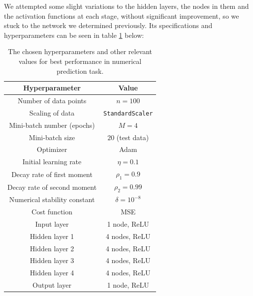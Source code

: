We attempted some slight variations to the hidden layers, the nodes in them and the activation functions at each stage, without significant improvement, so we stuck to the network we determined previously. Its specifications and hyperparameters can be seen in table \ref{tab:numericalprediction} below: 
\begin{table}[h!]
  \centering
  \small
  \begin{tabular}{|c|c|}
    \hline
    \textbf{Hyperparameter} & \textbf{Value} \\
    \hline
    Number of data points & $n = 100$ \\
    \hline
    Scaling of data & \texttt{StandardScaler} \\
    \hline
    Mini-batch number (epochs) & $M = 4$ \\
    \hline
    Mini-batch size & $20$ (test data) \\
    \hline
    Optimizer & Adam \\
    \hline
    Initial learning rate & $\eta = 0.1$ \\
    \hline
    Decay rate of first moment & $\rho_1 = 0.9$ \\
    \hline
    Decay rate of second moment & $\rho_2 = 0.99$ \\
    \hline
    Numerical stability constant & $\delta = 10^{-8}$ \\
    \hline
    Cost function & MSE \\
    \hline
    Input layer & 1 node, ReLU \\
    \hline
    Hidden layer 1 & 4 nodes, ReLU \\
    \hline
    Hidden layer 2 & 4 nodes, ReLU \\
    \hline
    Hidden layer 3 & 4 nodes, ReLU \\
    \hline
    Hidden layer 4 & 4 nodes, ReLU \\
    \hline
    Output layer & 1 node, ReLU \\
    \hline
  \end{tabular}
  \caption{The chosen hyperparameters and other relevant values for best performance in numerical prediction task.}
  \label{tab:numericalprediction}
\end{table}

